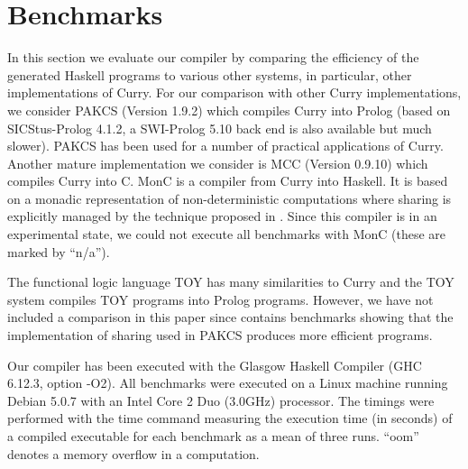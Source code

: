 \documentclass{llncs}
\begin{document}
\section{Benchmarks}
\label{sec:Benchmarks}

In this section we evaluate our compiler by comparing the
efficiency of the generated Haskell programs to various
other systems, in particular, other implementations of Curry.
For our comparison with other Curry implementations,
we consider PAKCS \cite{Hanus10PAKCS} (Version 1.9.2) which compiles
Curry into Prolog \cite{AntoyHanus00FROCOS}
(based on SICStus-Prolog 4.1.2, a SWI-Prolog 5.10 back end is also
available
but much slower). PAKCS has been used for a number of practical
applications of Curry.
Another mature implementation we consider is MCC \cite{Lux99FLOPS}
(Version 0.9.10) which compiles Curry into C.
MonC \cite{BrasselFischerHanusReck11} is a compiler
from Curry into Haskell. It is based on a monadic representation
of non-deterministic computations where sharing is explicitly
managed by the technique proposed in \cite{FischerKiselyovShan09}.
Since this compiler
is in an experimental state, we could not execute all benchmarks with
MonC (these are marked by ``n/a'').

The functional logic language TOY \cite{Lopez-FraguasSanchez-Hernandez99}
has many similarities to Curry and the TOY system compiles TOY programs
into Prolog programs. However, we have not included a comparison
in this paper since \cite{AntoyHanus00FROCOS} contains benchmarks
showing that the implementation of sharing used in PAKCS produces
more efficient programs.

Our compiler has been executed with the Glasgow Haskell Compiler
(GHC 6.12.3, option -O2). All benchmarks were executed on a Linux machine
running Debian 5.0.7 with an Intel Core 2 Duo (3.0GHz) processor.
The timings were performed with the time command measuring the
execution time (in seconds) of a compiled executable for each benchmark
as a mean of three runs. ``oom'' denotes a memory overflow in a computation.
\end{document}
